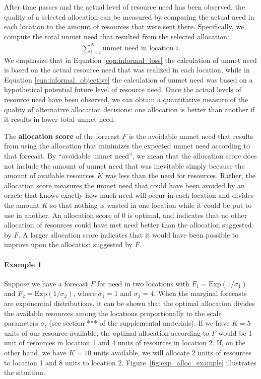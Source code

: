 \documentclass{article}
\begin{document}
After time passes and the actual level of resource need has been observed, the quality of a selected allocation can be measured by comparing the actual need in each location to the amount of resources that were sent there. Specifically, we compute the total unmet need that resulted from the selected allocation:
\begin{align}
    \sum_{i=1}^N \text{unmet need in location $i$}. \label{eqn:informal_loss}
\end{align}
We emphasize that in Equation \eqref{eqn:informal_loss} the calculation of unmet need is based on the actual resource need that was realized in each location, while in Equation \eqref{eqn:informal_objective} the calculation of unmet need was based on a hypothetical potential future level of resource need.
Once the actual levels of resource need have been observed, we can obtain a quantitative measure of the quality of alternative allocation decisions: one allocation is better than another if it results in lower total unmet need.

The \textbf{allocation score} of the forecast $F$ is the avoidable unmet need that results from using the allocation that minimizes the expected unmet need according to that forecast.
By ``avoidable unmet need'', we mean that the allocation score does not include the amount of unmet need that was inevitable simply because the amount of available resources $K$ was less than the need for resources.
Rather, the allocation score measures the unmet need that could have been avoided by an oracle that knows exactly how much need will occur in each location and divides the amount $K$ so that nothing is wasted in one location while it could be put to use in another. An allocation score of 0 is optimal, and indicates that no other allocation of resources could have met need better than the allocation suggested by $F$. A larger allocation score indicates that it would have been possible to improve upon the allocation suggested by $F$.

\paragraph{Example 1} Suppose we have a forecast $F$ for need in two locations with $F_1 = \mathrm{Exp}(1 / \sigma_1)$ and $F_2 = \mathrm{Exp}(1 / \sigma_2)$, where $\sigma_1 = 1$ and $\sigma_2 = 4$. When the marginal forecasts are exponential distributions, it can be shown that the optimal allocation divides the available resources among the locations proportionally to the scale parameters $\sigma_i$ (see section *** of the supplemental materials). If we have $K = 5$ units of our resource available, the optimal allocation according to $F$ would be 1 unit of resources in location 1 and 4 units of resources in location 2. If, on the other hand, we have $K = 10$ units available, we will allocate 2 units of resources to location 1 and 8 units to location 2. Figure~\ref{fig:exp_alloc_example} illustrates the situation.
\end{document}

